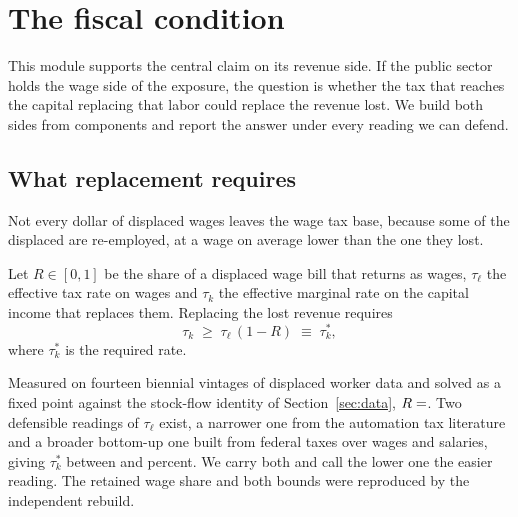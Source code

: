 \section{The fiscal condition}
\label{sec:fiscal}

This module supports the central claim on its revenue side. If the public sector holds the wage
side of the exposure, the question is whether the tax that reaches the capital replacing that
labor could replace the revenue lost. We build both sides from components and report the answer
under every reading we can defend.

\subsection{What replacement requires}

Not every dollar of displaced wages leaves the wage tax base, because some of the displaced are
re-employed, at a wage on average lower than the one they lost.

\begin{definition}
\label{def:condition}
Let $R \in [0,1]$ be the share of a displaced wage bill that returns as wages, $\tau_\ell$ the
effective tax rate on wages and $\tau_k$ the effective marginal rate on the capital income that
replaces them. Replacing the lost revenue requires
\begin{equation}
\tau_k \;\ge\; \tau_\ell\,(1 - R) \;\equiv\; \tau_k^{\ast},
\label{eq:condition}
\end{equation}
where $\tau_k^{\ast}$ is the required rate.
\end{definition}

Measured on fourteen biennial vintages of displaced worker data and solved as a fixed point
against the stock-flow identity of Section~\ref{sec:data}, $R = \result{RetainedWageShare}$. Two
defensible readings of $\tau_\ell$ exist, a narrower one from the automation tax literature and a
broader bottom-up one built from federal taxes over wages and salaries, giving
$\tau_k^{\ast}$ between  and  percent. We carry both and
call the lower one the easier reading. The retained wage share and both bounds were reproduced by
the independent rebuild.

